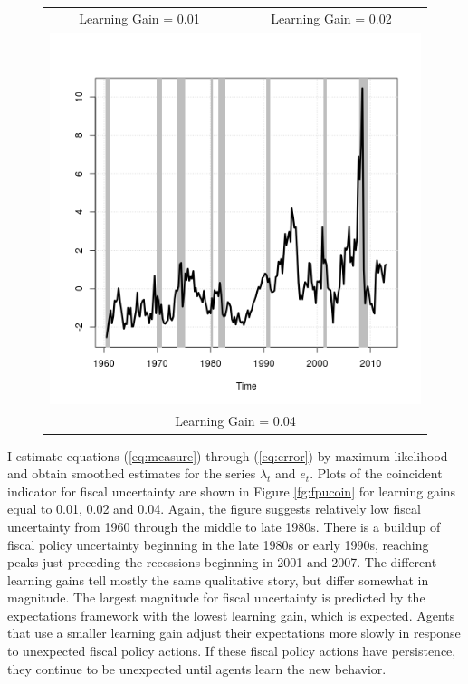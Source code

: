 \documentclass[11pt]{article}
\begin{document}
\begin{figure}
\begin{tabular}{cc}
Learning Gain = 0.01 & Learning Gain = 0.02 \\ 
\multicolumn{2}{c}{\includegraphics[scale=0.5]{./results/pics0.04/fpucoin.png}} \\
\multicolumn{2}{c}{Learning Gain = 0.04} 
\end{tabular}
\end{figure} 

I estimate equations (\ref{eq:measure}) through (\ref{eq:error}) by maximum likelihood and obtain smoothed estimates for the series $\lambda_t$ and $e_t$.  Plots of the coincident indicator for fiscal uncertainty are shown in Figure \ref{fg:fpucoin} for learning gains equal to 0.01, 0.02 and 0.04.  Again, the figure suggests relatively low fiscal uncertainty from 1960 through the middle to late 1980s.  There is a buildup of fiscal policy uncertainty beginning in the late 1980s or early 1990s, reaching peaks just preceding the recessions beginning in 2001 and 2007.  The different learning gains tell mostly the same qualitative story, but differ somewhat in magnitude.  The largest magnitude for fiscal uncertainty is predicted by the expectations framework with the lowest learning gain, which is expected.  Agents that use a smaller learning gain adjust their expectations more slowly in response to unexpected fiscal policy actions.  If these fiscal policy actions have persistence, they continue to be unexpected until agents learn the new behavior.  
\end{document}

